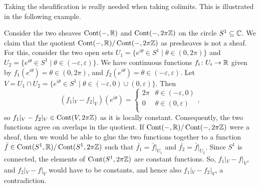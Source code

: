 \documentclass{article}
\DeclareMathOperator{\Cont}{Cont}
\begin{document}
Taking the sheafification is really needed when
taking colimits. This is illustrated in the following
example.
\begin{example}
    Consider the two sheaves $\Cont(-, \bbR)$ and
    $\Cont(-, 2\pi \bbZ)$ on the circle $S^1 \subseteq \mathbb{C}$.
    We claim that the quotient $\Cont(-, \bbR)/ \Cont(-, 2\pi \bbZ)$
    as presheaves is not a sheaf. For this, consider
    the two open sets
    $U_1 = \{e^{i\theta} \in S^1 \mid \theta \in(0, 2\pi) \}$ and
    $U_2 = \{e^{i\theta} \in S^1 \mid \theta \in(-\varepsilon, \varepsilon) \}$.
    We have continuous functions $f_i \colon U_i \to \mathbb{R}$ given by
    $f_1(e^{i\theta}) = \theta \in (0, 2\pi )$, and
    $f_2(e^{i\theta}) = \theta \in (- \varepsilon, \varepsilon)$.
    Let $V = U_1 \cap U_2 = \{e^{i\theta} \in S^1 \mid \theta \in (-\varepsilon,0)\cup(0, \varepsilon) \}$.
    Then
    \begin{equation*}
        (f_1 |_V - f_2 |_V)(e^{i \theta}) =
        \begin{cases}
            2 \pi & \theta \in (-\varepsilon, 0) \\
            0     & \theta \in (0, \varepsilon)  \\
        \end{cases},
    \end{equation*}
    so $f_1|_{V} - f_2|_V \in \Cont(V, 2 \pi \bbZ)$ as it is locally constant.
    Consequently, the two functions agree on overlaps in the quotient.
    If $\Cont(-, \bbR)/\Cont(-, 2\pi \bbZ)$
    were a sheaf, then we would be able to glue the two functions together
    to a function $\bar{f} \in \Cont(S^1, \bbR)/ \Cont(S^1 , 2\pi \bbZ)$
    such that $\bar{f_1} = \bar{f}|_{U_1}$ and $\bar{f_2} = \bar{f}|_{U_2}$.
    Since $S^1$ is connected, the elements of $\Cont(S^1, 2 \pi \bbZ)$ are
    constant functions. So, $f_1 |_V - f|_V$, and $f_2 |_ V - f|_V$ would
    have to be constants, and hence also $f_1 |_V - f_2 |_V$, a contradiction.
\end{example}
\end{document}
